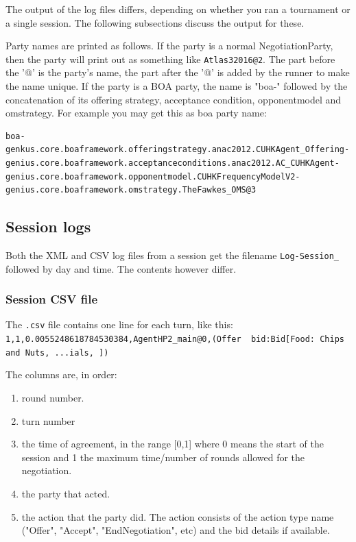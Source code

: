 \documentclass[]{article}
\begin{document}
The output of the log files differs, depending on whether you ran a tournament or a single session. The following subsections discuss the output for these.

Party names are printed as follows. If the party is a normal NegotiationParty, then the party will print out as something like \verb|Atlas32016@2|. The part before the '@' is the party's name, the part after the '@' is added by the runner to make the name unique. If the party is a BOA party, the name is "boa-" followed by the concatenation of its offering strategy, acceptance condition, opponentmodel and omstrategy. For example you may get this as boa party name:

\begin{verbatim}
boa-genkus.core.boaframework.offeringstrategy.anac2012.CUHKAgent_Offering-
genius.core.boaframework.acceptanceconditions.anac2012.AC_CUHKAgent-
genius.core.boaframework.opponentmodel.CUHKFrequencyModelV2-
genius.core.boaframework.omstrategy.TheFawkes_OMS@3
\end{verbatim}


\subsection{Session logs}
Both the XML and CSV log files from a session get the filename \verb|Log-Session_| followed by day and time. The contents however differ.

\subsubsection{Session CSV file}
 The \verb|.csv| file contains one line for each turn, like this:
\verb|1,1,0.0055248618784530384,AgentHP2_main@0,(Offer  bid:Bid[Food: Chips and Nuts, ...ials, ])|

The columns are, in order:
\begin{enumerate}
\item round number.
\item turn number
\item the time of agreement, in the range [0,1] where 0 means the start of the session and 1 the maximum time/number of rounds allowed for the negotiation. 
\item the party that acted.
\item the action that the party did. The action consists of the action type name ("Offer", "Accept", "EndNegotiation", etc) and the bid details if available.
\end{enumerate}
\end{document}
